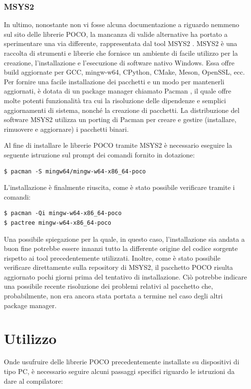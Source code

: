 \subsubsection{MSYS2}
In ultimo, nonostante non vi fosse alcuna documentazione a riguardo nemmeno sul sito delle librerie POCO, la mancanza di valide alternative ha portato a sperimentare una via differente, rappresentata dal tool MSYS2 \cite{MSYS2}. MSYS2 è una raccolta di strumenti e librerie che fornisce un ambiente di facile utilizzo per la creazione, l'installazione e l'esecuzione di software nativo Windows. Essa offre build aggiornate per GCC, mingw-w64, CPython, CMake, Meson, OpenSSL, ecc. Per fornire una facile installazione dei pacchetti e un modo per mantenerli aggiornati, è dotata di un package manager chiamato Pacman \cite{Pacman}, il quale offre molte potenti funzionalità tra cui la risoluzione delle dipendenze e semplici aggiornamenti di sistema, nonché la creazione di pacchetti. La distribuzione del software MSYS2 utilizza un porting di Pacman per creare e gestire (installare, rimuovere e aggiornare) i pacchetti binari.

Al fine di installare le librerie POCO tramite MSYS2 è necessario eseguire la seguente istruzione sul prompt dei comandi fornito in dotazione:

\begin{verbatim}
$ pacman -S mingw64/mingw-w64-x86_64-poco
\end{verbatim}

L’installazione è finalmente riuscita, come è stato possibile verificare tramite i comandi:

\begin{verbatim}
$ pacman -Qi mingw-w64-x86_64-poco
$ pactree mingw-w64-x86_64-poco
\end{verbatim}

Una possibile spiegazione per la quale, in questo caso, l’installazione sia andata a buon fine potrebbe essere innanzi tutto la differente origine del codice sorgente rispetto ai tool precedentemente utilizzati. Inoltre, come è stato possibile verificare direttamente sulla repository di MSYS2, il pacchetto POCO risulta aggiornato pochi giorni prima del tentativo di installazione. Ciò potrebbe indicare una possibile recente risoluzione dei problemi relativi al pacchetto che, probabilmente, non era ancora stata portata a termine nel caso degli altri package manager.

\section{Utilizzo}\label{utilizzo}
Onde usufruire delle librerie POCO precedentemente installate su dispositivi di tipo PC, è necessario seguire alcuni passaggi specifici riguardo le istruzioni da dare al compilatore:

